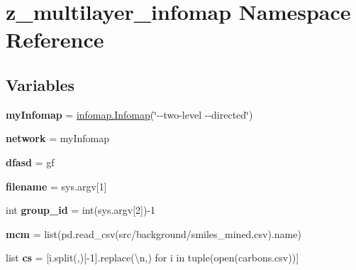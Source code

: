 \hypertarget{namespacez__multilayer__infomap}{}\section{z\+\_\+multilayer\+\_\+infomap Namespace Reference}
\label{namespacez__multilayer__infomap}
\subsection*{Variables}
\begin{DoxyCompactItemize}
\item 
\mbox{\label{namespacez__multilayer__infomap_a65eb72713d13dfa99a4edaba19f5c9e5}} 
{\bfseries my\+Infomap} = \mbox{\hyperlink{classinfomap_1_1Infomap}{infomap.\+Infomap}}(\char`\"{}-\/-\/two-\/level -\/-\/directed\char`\"{})
\item 
\mbox{\label{namespacez__multilayer__infomap_aecfc531ba3ab5acfdc0f8820d4c29a1d}} 
{\bfseries network} = my\+Infomap
\item 
\mbox{\label{namespacez__multilayer__infomap_a969db76e740991495dafcec49710bfa1}} 
{\bfseries dfasd} = gf
\item 
\mbox{\label{namespacez__multilayer__infomap_a1794089034324504f02c071eb55745d5}} 
{\bfseries filename} = sys.\+argv\mbox{[}1\mbox{]}
\item 
\mbox{\label{namespacez__multilayer__infomap_a3cc3f35433f151ea4d2605091b6cd1a7}} 
int {\bfseries group\+\_\+id} = int(sys.\+argv\mbox{[}2\mbox{]})-\/1
\item 
\mbox{\label{namespacez__multilayer__infomap_a770d80d697ee9c172a689562ee926f18}} 
{\bfseries mcm} = list(pd.\+read\+\_\+csv(\textquotesingle{}src/background/smiles\+\_\+mined.\+csv\textquotesingle{}).name)
\item 
\mbox{\label{namespacez__multilayer__infomap_ad2274aa3941effad33cf020bfaacd4f0}} 
list {\bfseries cs} = \mbox{[}i.\+split(\textquotesingle{},\textquotesingle{})\mbox{[}-\/1\mbox{]}.replace(\textquotesingle{}\textbackslash{}n\textquotesingle{},\textquotesingle{}\textquotesingle{}) for i in tuple(open(\textquotesingle{}carbons.\+csv\textquotesingle{}))\mbox{]}

\end{DoxyCompactItemize}
